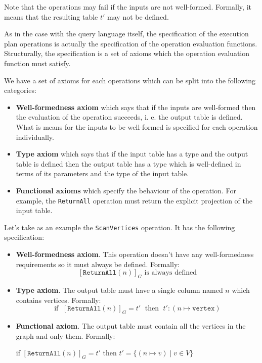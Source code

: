 \documentclass[14pt]{constructor-thesis}
\theoremstyle{definition}
\begin{document}
Note that the operations may fail if the inputs are not well-formed. Formally, it means that the resulting table $t'$ may not be defined.

As in the case with the query language itself, the specification of the execution plan operations is actually the specification of the operation evaluation functions. Structurally, the specification is a set of axioms which the operation evaluation function must satisfy.

We have a set of axioms for each operations which can be split into the following categories:
\begin{itemize}
  \item \textbf{Well-formedness axiom} which says that if the inputs are well-formed then the evaluation of the operation succeeds, i. e. the output table is defined. What is means for the inputs to be well-formed is specified for each operation individually.
  \item \textbf{Type axiom} which says that if the input table has a type and the output table is defined then the output table has a type which is well-defined in terms of its parameters and the type of the input table.
  \item \textbf{Functional axioms} which specify the behaviour of the operation. For example, the \texttt{ReturnAll} operation must return the explicit projection of the input table.

\end{itemize}

Let's take as an example the \texttt{ScanVertices} operation. It has the following specification:
\begin{itemize}
  \item \textbf{Well-formedness axiom}. This operation doesn't have any well-formedness requirements so it must always be defined. Formally:
  $$ [\texttt{ReturnAll}(n)]_G \text{ is always defined} $$
  \item \textbf{Type axiom}. The output table must have a single column named $n$ which contains vertices. Formally:
  $$ \text{if } \; [\texttt{ReturnAll}(n)]_G = t' \; \text{ then } \; t' : (n \mapsto \texttt{vertex}) $$
  \item \textbf{Functional axiom}. The output table must contain all the vertices in the graph and only them. Formally:
  \begin{center}
    if $[\texttt{ReturnAll}(n)]_G = t'$ then $t' = \{(n \mapsto v) \mid v \in V\}$
  \end{center}
\end{itemize}
\end{document}

